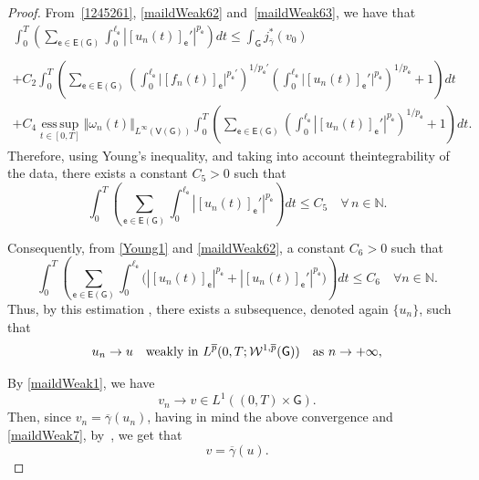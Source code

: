\documentclass[reqno,12pt]{amsart}
\def\N{\mathbb N} %
\def\e{\mathsf{e}} 	%
\newcommand{\G}{\mathsf{G}}	%
\newcommand{\V}{\mathsf{V}}	%
\newcommand{\E}{\mathsf{E}}	%
\numberwithin{equation}{section} %
\begin{document}
\begin{proof}
From~\eqref{1245261}, \eqref{maildWeak62} and~\eqref{maildWeak63}, we have that  
\begin{equation}\label{124526102}
\begin{array}{c}
\displaystyle
\int_0^T \left( \sum_{\e \in\E(\G)}\int_{0}^{\ell_\e}|[u_n(t)]_\e'|^{p_\e}  \right)  dt \le \int_\G j^*_{\overline{\gamma}}(v_{0})
\\ \\
\displaystyle   + C_2\int_0^T   \left(\sum_{\e \in\E(\G)}\left(\int_{0}^{\ell_\e}\vert [f_n(t)]_\e\vert^{p_\e'}\right)^{1/{p_\e'}}   \left( \int_{0}^{\ell_\e}\vert [u_n(t)]_\e'\vert^{p_\e}\right)^{1/{p_\e}} +1  \right)  dt 
\\
\displaystyle  
 + C_4 \operatorname*{ess\,sup}_{t\in[0,T]}
   \Vert \omega_n(t)\Vert_{L^\infty(\V(\G))}   \int_0^T   \left(   \sum_{\e \in\E(\G)}  \left( \int_{0}^{\ell_\e}|[u_n(t)]_\e'|^{p_\e} \right)^{1/p_\e} +1  \right)   dt  .
\end{array}
\end{equation}
 Therefore, using Young's inequality, and taking into  account theintegrability of the data, there exists a constant $C_5>0$ such  that
\begin{equation}\label{Young1}
\displaystyle \int_0^T \left( \sum_{\e \in\E(\G)}\int_{0}^{\ell_\e}|[u_n(t)]_\e'|^{p_\e}\right)dt \le C_5  \quad \forall \, n \in \N. 
\end{equation}



 Consequently, from \eqref{Young1} and \eqref{maildWeak62}, 
  a constant $C_6 >0$ such that
 \begin{equation}\label{maildWeakNM}
  \int_0^T \left(\sum_{\e \in\E(\G)} \int_{0}^{\ell_\e}\Big(|[u_n(t)]_\e|^{p_\e} +|[u_n(t)]_\e'|^{p_\e}\Big) \right)dt   \leq C_6  \quad\forall n\in \N.
\end{equation}
Thus, by this estimation , there exists a subsequence, denoted again $\{ u_n \}$, such that  
\begin{equation}\label{maildWeak7}
u_n \to u \quad \hbox{weakly in }    L^{\overline{p}}(0, T; \mathcal{W}^{1,\overline{p}}(\G)) \quad \hbox{as }   n \to +\infty, 
\end{equation}
 

By \eqref{maildWeak1},
 we have
$$v_n \to v \in L^1((0,T) \times \G).$$
Then,  since $v_n = \overline{\gamma}(u_n)$, having in mind   the above convergence and   \eqref{maildWeak7},  by~\cite[Lemma~G]{BCS88}, we get that $$v = \overline{\gamma}(u).$$


\end{proof}
\end{document}
